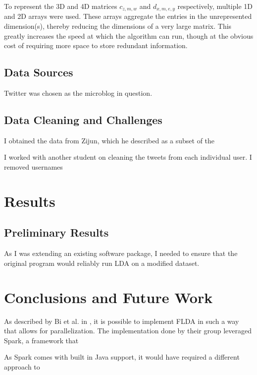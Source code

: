 \documentclass[a4paper]{article}
\begin{document}
To represent the 3D and 4D matrices $c_{z, m, w}$ and $d_{x, m, e, y}$ respectively, multiple 1D and 2D arrays were used. These arrays aggregate the entries in the unrepresented dimension(s), thereby reducing the dimensions of a very large matrix. This greatly increases the speed at which the algorithm can run, though at the obvious cost of requiring more space to store redundant information.

\subsection{Data Sources}
Twitter was chosen as the microblog in question.

\subsection{Data Cleaning and Challenges}
I obtained the data from Zijun, which he described as a subset of the 

I worked with another student on cleaning the tweets from each individual user. I removed usernames 


\section{Results}
\label{sec:results}
\subsection{Preliminary Results}
As I was extending an existing software package, I needed to ensure that the original program would reliably run LDA on a modified dataset.


\section{Conclusions and Future Work}
\label{sec:conc}

As described by Bi et al. in \cite{flda}, it is possible to implement FLDA in such a way that allows for parallelization. The implementation done by their group leveraged Spark, a framework that 

As Spark comes with built in Java support, it would have required a different approach to 

\end{document}
